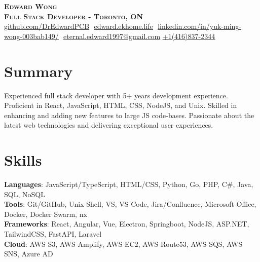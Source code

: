 \documentclass[letterpaper,11pt]{article}
\begin{document}

\vspace*{10pt}

\begin{center}
    \textbf{\Huge \scshape Edward Wong} \\ \vspace{8pt}
      \textbf{\small \scshape Full Stack Developer - Toronto, ON} \\ \vspace{8pt}
    \small 
    \href{https://github.com/DrEdwardPCB}{\underline{github.com/DrEdwardPCB}} $  $
    \href{https://edward.ekhome.life}
    {\underline{edward.ekhome.life}} $  $
    \href{https://www.linkedin.com/in/yuk-ming-wong-003bab149/}{\underline{linkedin.com/in/yuk-ming-wong-003bab149/}} $  $\newline
    \href{mailto:eternal.edward1997@gmail.com}
    {\underline{eternal.edward1997@gmail.com}}$  $
    \href{tel:+14168372344}
    {\underline{+1(416)837-2344}}
\end{center}
\section{Summary}
  {\small{Experienced full stack developer with 5+ years development experience. Proficient in React, JavaScript, HTML, CSS, NodeJS, and Unix. Skilled in enhancing and adding new features to large JS code-bases. Passionate about the latest web technologies and delivering exceptional user experiences.}}
  
\section{Skills}
 \begin{itemize}[leftmargin=0.15in, label={}]
    \small{\item{
    
     \textbf{Languages}{: JavaScript/TypeScript, HTML/CSS, Python, Go, PHP, C\#, Java, SQL, NoSQL} \\
     
     \textbf{Tools}{: Git/GitHub, Unix Shell, VS, VS Code, Jira/Confluence, Microsoft Office, Docker, Docker Swarm, nx }\\
     
    \textbf{Frameworks}{: React, Angular, Vue, Electron, Springboot, NodeJS, ASP.NET, TailwindCSS, FastAPI, Laravel}\\
    \textbf{Cloud}{: AWS S3, AWS Amplify, AWS EC2, AWS Route53, AWS SQS, AWS SNS, Azure AD}
     
    }}
 \end{itemize}
 
\end{document}
